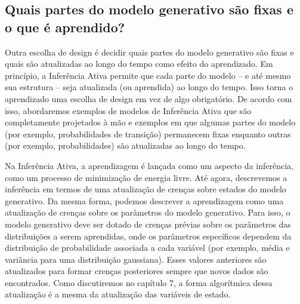 \documentclass[
  12pt,
]{book}
\begin{document}
\hypertarget{quais-partes-do-modelo-generativo-suxe3o-fixas-e-o-que-uxe9-aprendido}{%
\subsection{Quais partes do modelo generativo são fixas e o que é aprendido?\textbar{}}\label{quais-partes-do-modelo-generativo-suxe3o-fixas-e-o-que-uxe9-aprendido}}

Outra escolha de design é decidir quais partes do modelo generativo são fixas e quais são atualizadas ao longo do tempo como efeito do aprendizado. Em princípio, a Inferência Ativa permite que cada parte do modelo -- e até mesmo sua estrutura -- seja atualizada (ou aprendida) ao longo do tempo. Isso torna o aprendizado uma escolha de design em vez de algo obrigatório. De acordo com isso, abordaremos exemplos de modelos de Inferência Ativa que são completamente projetados à mão e exemplos em que algumas partes do modelo (por exemplo, probabilidades de transição) permanecem fixas enquanto outras (por exemplo, probabilidades) são atualizadas ao longo do tempo.

Na Inferência Ativa, a aprendizagem é lançada como um aspecto da inferência, como um processo de minimização de energia livre. Até agora, descrevemos a inferência em termos de uma atualização de crenças sobre estados do modelo generativo. Da mesma forma, podemos descrever a aprendizagem como uma atualização de crenças sobre os parâmetros do modelo generativo. Para isso, o modelo generativo deve ser dotado de crenças prévias sobre os parâmetros das distribuições a serem aprendidas, onde os parâmetros específicos dependem da distribuição de probabilidade associada a cada variável (por exemplo, média e variância para uma distribuição gaussiana). Esses valores anteriores são atualizados para formar crenças posteriores sempre que novos dados são encontrados. Como discutiremos no capítulo 7, a forma algorítmica dessa atualização é a mesma da atualização das variáveis de estado.
\end{document}
